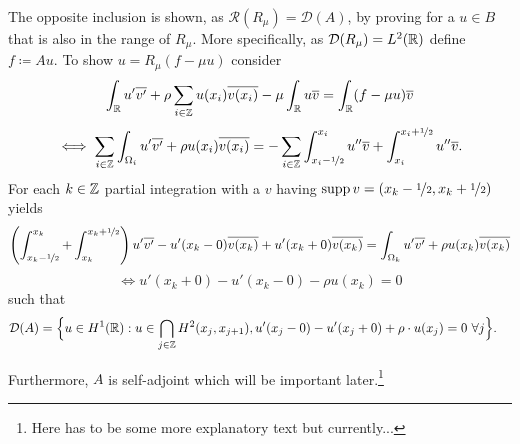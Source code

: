 The opposite inclusion is shown, as $\mathcal{R}(R_{\mu}) = \mathcal{D}(A)$, by proving for a $u \in B$ that is also in the range of $R_{\mu}$. More specifically, as $\mathcal{D}(R_{\mu}) = L^{2}(\mathbb{R})$ define $f \coloneqq A u$. To show $u = R_{\mu}(f - \mu u)$ consider
	\[ \int_{\mathbb{R}} u' \overline{v'} + \rho \sum_{i \in \mathbb{Z}} u(x_{i}) \overline{v(x_{i})} - \mu \int_{\mathbb{R}} u \overline{v}= \int_{\mathbb{R}}(f-\mu u) \overline{v} \]
	\[ \iff \sum_{i \in \mathbb{Z}} \int_{\Omega_{i}} u' \overline{v'} + \rho u(x_{i}) \overline{v(x_{i})} = - \sum_{i \in \mathbb{Z}} \int_{x_{i} - \nicefrac{1}{2}}^{x_{i}} u'' \overline{v} + \int_{x_{i}}^{x_{i} + \nicefrac{1}{2}} u'' \overline{v}. \]
	For each $k \in \mathbb{Z}$ partial integration with a $v$ having $\operatorname{supp} v = (x_{k} - \nicefrac{1}{2}, x_{k} + \nicefrac{1}{2})$ yields
	\[ \left( \int_{x_{k} - \nicefrac{1}{2}}^{x_{k}} + \int_{x_{k}}^{x_{k} +\nicefrac{1}{2}} \right) u' \overline{v'} - u'(x_{k}-0) \overline{v(x_{k})}  + u'(x_{k}+0) \overline{v(x_{k})}  = \int_{\Omega_{k}} u' \overline{v'} + \rho u(x_{k}) \overline{v(x_{k})} \]
	\[ \iff u'(x_{k}+0) - u'(x_{k}-0) - \rho u(x_{k}) = 0 \]
	such that
	\begin{align*}
		\mathcal{D}(A) & = \Big\{ u \in H^{1}(\mathbb{R}): u \in \bigcap_{j \in \mathbb{Z}} H^{2}(x_{j} , x_{j+1}), u'(x_{j} - 0) - u'(x_{j} + 0) + \rho \cdot u(x_{j}) = 0 ~\forall j \Big\}.
	\end{align*}

Furthermore, $A$ is self-adjoint which will be important later.\footnote{Here has to be some more explanatory text but currently...}
\newpage %

